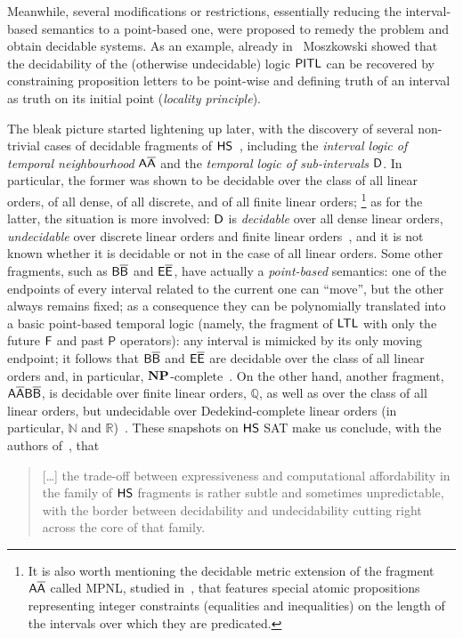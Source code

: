 Meanwhile, several modifications or restrictions, essentially reducing the interval-based semantics to
a point-based one,  were proposed to remedy the problem and obtain decidable systems. As an example, already in~\cite{digital_circuits_thesis} Moszkowski showed that the decidability of the (otherwise undecidable) logic $\text{\sffamily PITL}$ can be recovered by constraining  proposition letters to be
point-wise and defining truth of an interval as truth on its initial point (\emph{locality principle}). 

The bleak picture started lightening up later, with the discovery of several non-trivial cases of decidable fragments of $\text{\sffamily HS}$~\cite{DBLP:journals/logcom/BresolinGMS10, DBLP:journals/apal/BresolinGMS09, BMSS11, MPS10,MPSS10,DBLP:conf/time/MontanariS12INS, DBLP:conf/tableaux/BresolinMSS11INS}, including the \emph{interval logic of temporal
neighbourhood} $\mathsf{A\overline{A}}$ and the \emph{temporal logic of sub-intervals} $\mathsf{D}$. %
In particular, the former was shown to be decidable over the class of 
all linear orders, of all dense, of all discrete, and of all finite linear orders;%
\footnote{It is also worth mentioning the decidable metric extension of the fragment $\mathsf{A\overline{A}}$ called MPNL, studied in~\cite{DBLP:journals/sosym/BresolinMGMS13,DBLP:conf/ecai/BresolinMGMS10,DBLP:journals/corr/abs-1106-1241}, that features 
special atomic propositions representing integer constraints (equalities  and  inequalities) on the length of the intervals over which they are predicated.}
as for the latter, the situation is more involved:
$\mathsf{D}$ is \emph{decidable} over all dense linear orders, \emph{undecidable} over discrete linear orders and finite linear orders~\cite{DBLP:journals/fuin/MarcinkowskiM14}, 
and it is not known whether it is decidable or not in the case of all linear orders.
%
Some other fragments, such as $\mathsf{B}\mathsf{\overline{B}}$ and $\mathsf{E}\mathsf{\overline{E}}$, have actually a \emph{point-based} semantics: one of the endpoints of every interval related to the current one can ``move'', but the other always remains fixed; as a consequence they can be polynomially translated into a basic point-based temporal logic (namely, the fragment of $\text{\sffamily LTL}$ with only the future $\textsf{F}$ and past $\mathsf{P}$ operators): any interval is mimicked by its only moving endpoint; it follows that $\mathsf{B}\mathsf{\overline{B}}$ and $\mathsf{E}\mathsf{\overline{E}}$ are decidable over the class of all linear orders and, in particular, $\textbf{NP}$-complete~\cite{roadmap_intervals}.
%
On the other hand, another fragment, $\mathsf{A\overline{A}B\overline{B}}$, is decidable over finite linear orders, $\mathbb{Q}$, as well as over the class of
all linear orders, but undecidable over Dedekind-complete linear orders (in particular, $\mathbb{N}$ and $\mathbb{R}$)~\cite{DBLP:conf/mfcs/MontanariPS14Ratio}.
%
These snapshots on $\text{\sffamily HS}$ SAT make us conclude, with the authors of~\cite{DBLP:journals/eatcs/MonicaGMS11}, that
\begin{quote}
[\dots] the trade-off
between expressiveness and computational affordability in the family of $\text{\sffamily HS}$ fragments
is rather subtle and sometimes unpredictable, with the border between decidability and undecidability cutting right
across the core of that family.
\end{quote}

